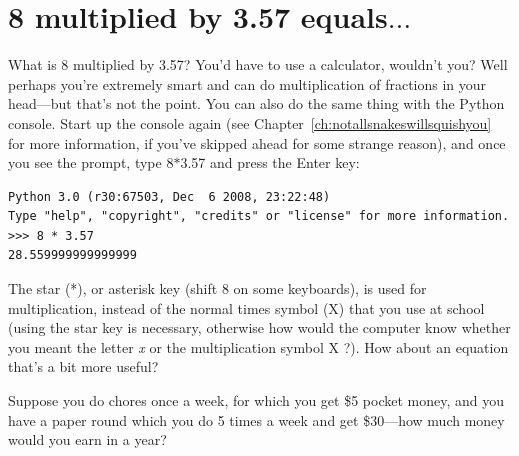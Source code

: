 

\chapter{8 multiplied by 3.57 equals$\ldots$}\label{ch:8multipliedby3.57}

What is 8 multiplied by 3.57?  You'd have to use a calculator, wouldn't you?  Well perhaps you're extremely smart and can do multiplication of fractions in your head---but that's not the point.  You can also do the same thing with the Python console. Start up the console again (see Chapter~\ref{ch:notallsnakeswillsquishyou} for more information, if you've skipped ahead for some strange reason), and once you see the prompt, type 8$*$3.57 and press the Enter key:

\begin{listing}
\begin{verbatim}
Python 3.0 (r30:67503, Dec  6 2008, 23:22:48) 
Type "help", "copyright", "credits" or "license" for more information.
>>> 8 * 3.57
28.559999999999999
\end{verbatim}
\end{listing}

The star (*), or asterisk key (shift 8 on some keyboards), is used for multiplication, instead of the normal times symbol (\textsf{X}) that you use at school (using the star key is necessary, otherwise how would the computer know whether you meant the letter \emph{x} or the multiplication symbol \textsf{X} ?).  How about an equation that's a bit more useful?

Suppose you do chores once a week, for which you get \$5 pocket money, and you have a paper round which you do 5 times a week and get \$30---how much money would you earn in a year?

